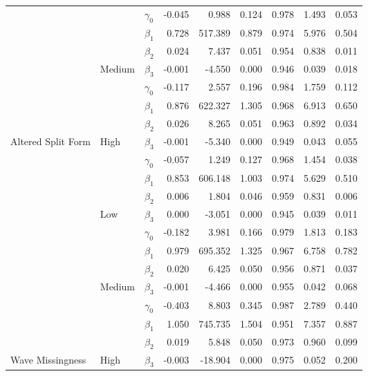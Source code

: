 \documentclass{article}\usepackage[]{graphicx}\usepackage[]{color}
\newenvironment{knitrout}{}{} %
\begin{document}
\begin{knitrout}
\begin{table}[H]
{\begin{tabular}[t]{l|l|l|r|r|r|r|r|r}
\cline{2-9}
 &  & $\gamma_0$ & -0.045 & 0.988 & 0.124 & 0.978 & 1.493 & 0.053\\
\cline{3-9}
 &  & $\beta_1$ & 0.728 & 517.389 & 0.879 & 0.974 & 5.976 & 0.504\\
\cline{3-9}
 &  & $\beta_2$ & 0.024 & 7.437 & 0.051 & 0.954 & 0.838 & 0.011\\
\cline{3-9}
 & \multirow{-4}{*}{\raggedright\arraybackslash Medium} & $\beta_3$ & -0.001 & -4.550 & 0.000 & 0.946 & 0.039 & 0.018\\
\cline{2-9}
 &  & $\gamma_0$ & -0.117 & 2.557 & 0.196 & 0.984 & 1.759 & 0.112\\
\cline{3-9}
 &  & $\beta_1$ & 0.876 & 622.327 & 1.305 & 0.968 & 6.913 & 0.650\\
\cline{3-9}
 &  & $\beta_2$ & 0.026 & 8.265 & 0.051 & 0.963 & 0.892 & 0.034\\
\cline{3-9}
\multirow{-12}{*}{\raggedright\arraybackslash Altered Split Form} & \multirow{-4}{*}{\raggedright\arraybackslash High} & $\beta_3$ & -0.001 & -5.340 & 0.000 & 0.949 & 0.043 & 0.055\\
\cline{1-9}
 &  & $\gamma_0$ & -0.057 & 1.249 & 0.127 & 0.968 & 1.454 & 0.038\\
\cline{3-9}
 &  & $\beta_1$ & 0.853 & 606.148 & 1.003 & 0.974 & 5.629 & 0.510\\
\cline{3-9}
 &  & $\beta_2$ & 0.006 & 1.804 & 0.046 & 0.959 & 0.831 & 0.006\\
\cline{3-9}
 & \multirow{-4}{*}{\raggedright\arraybackslash Low} & $\beta_3$ & 0.000 & -3.051 & 0.000 & 0.945 & 0.039 & 0.011\\
\cline{2-9}
 &  & $\gamma_0$ & -0.182 & 3.981 & 0.166 & 0.979 & 1.813 & 0.183\\
\cline{3-9}
 &  & $\beta_1$ & 0.979 & 695.352 & 1.325 & 0.967 & 6.758 & 0.782\\
\cline{3-9}
 &  & $\beta_2$ & 0.020 & 6.425 & 0.050 & 0.956 & 0.871 & 0.037\\
\cline{3-9}
 & \multirow{-4}{*}{\raggedright\arraybackslash Medium} & $\beta_3$ & -0.001 & -4.466 & 0.000 & 0.955 & 0.042 & 0.068\\
\cline{2-9}
 &  & $\gamma_0$ & -0.403 & 8.803 & 0.345 & 0.987 & 2.789 & 0.440\\
\cline{3-9}
 &  & $\beta_1$ & 1.050 & 745.735 & 1.504 & 0.951 & 7.357 & 0.887\\
\cline{3-9}
 &  & $\beta_2$ & 0.019 & 5.848 & 0.050 & 0.973 & 0.960 & 0.099\\
\cline{3-9}
\multirow{-12}{*}{\raggedright\arraybackslash Wave Missingness} & \multirow{-4}{*}{\raggedright\arraybackslash High} & $\beta_3$ & -0.003 & -18.904 & 0.000 & 0.975 & 0.052 & 0.200\\
\hline
\end{tabular}}
\end{table}


\end{knitrout}
\end{document}

